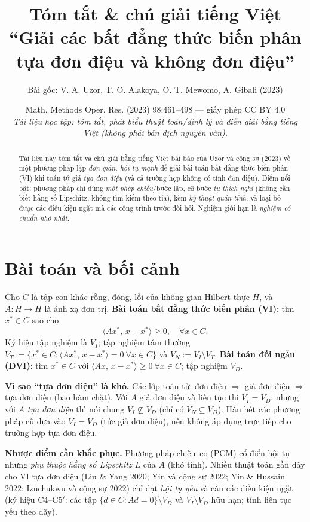 \documentclass[11pt,a4paper]{article}
\title{\vspace{-1.2cm}\bfseries Tóm tắt \& chú giải tiếng Việt\\[4pt]
\large ``Giải các bất đẳng thức biến phân tựa đơn điệu và không đơn điệu''}
\author{\normalsize Bài gốc: V. A. Uzor, T. O. Alakoya, O. T. Mewomo, A. Gibali (2023)}
\date{\small Math. Methods Oper. Res. (2023) 98:461--498 --- giấy phép CC BY 4.0\\[2pt]
\textit{Tài liệu học tập: tóm tắt, phát biểu thuật toán/định lý và diễn giải bằng tiếng Việt (không phải bản dịch nguyên văn).}}
\theoremstyle{plain}
\theoremstyle{definition}
\newcommand{\inp}[2]{\langle #1,\,#2\rangle}
\begin{document}
\maketitle

\begin{abstract}
\noindent Tài liệu này tóm tắt và chú giải bằng tiếng Việt bài báo của Uzor và cộng sự (2023) về một phương pháp lặp \emph{đơn giản, hội tụ mạnh} để giải bài toán bất đẳng thức biến phân (VI) khi toán tử giá \emph{tựa đơn điệu} (và cả trường hợp không có tính đơn điệu). Điểm nổi bật: phương pháp chỉ dùng \emph{một phép chiếu}/bước lặp, cỡ bước \emph{tự thích nghi} (không cần biết hằng số Lipschitz, không tìm kiếm theo tia), kèm \emph{kỹ thuật quán tính}, và loại bỏ được các điều kiện ngặt mà các công trình trước đòi hỏi. Nghiệm giới hạn là \emph{nghiệm có chuẩn nhỏ nhất}.
\end{abstract}

\section{Bài toán và bối cảnh}

Cho $C$ là tập con khác rỗng, đóng, lồi của không gian Hilbert thực $H$, và $A:H\to H$ là ánh xạ đơn trị. \textbf{Bài toán bất đẳng thức biến phân (VI)}: tìm $x^{*}\in C$ sao cho
\[
\inp{Ax^{*}}{x-x^{*}}\ge 0,\quad\forall x\in C. \tag{1.1}
\]
Ký hiệu tập nghiệm là $V_I$; tập nghiệm tầm thường $V_T:=\{x^{*}\in C:\inp{Ax^{*}}{x-x^{*}}=0\ \forall x\in C\}$ và $V_N:=V_I\setminus V_T$. \textbf{Bài toán đối ngẫu (DVI)}: tìm $x^{*}\in C$ với $\inp{Ax}{x-x^{*}}\ge 0\ \forall x\in C$; tập nghiệm $V_D$.

\medskip
\noindent\textbf{Vì sao ``tựa đơn điệu'' là khó.} Các lớp toán tử: đơn điệu $\Rightarrow$ giả đơn điệu $\Rightarrow$ tựa đơn điệu (bao hàm chặt). Với $A$ giả đơn điệu và liên tục thì $V_I=V_D$; nhưng với $A$ \emph{tựa đơn điệu} thì nói chung $V_I\not\subseteq V_D$ (chỉ có $V_N\subseteq V_D$). Hầu hết các phương pháp cũ dựa vào $V_I=V_D$ (tức giả đơn điệu), nên không áp dụng trực tiếp cho trường hợp tựa đơn điệu.

\medskip
\noindent\textbf{Nhược điểm cần khắc phục.} Phương pháp chiếu--co (PCM) cổ điển hội tụ nhưng \emph{phụ thuộc hằng số Lipschitz $L$} của $A$ (khó tính). Nhiều thuật toán gần đây cho VI tựa đơn điệu (Liu \& Yang 2020; Yin và cộng sự 2022; Yin \& Hussain 2022; Izuchukwu và cộng sự 2022) chỉ đạt \emph{hội tụ yếu} và cần các điều kiện ngặt (ký hiệu C4--C5$'$: các tập $\{d\in C:Ad=0\}\setminus V_D$ và $V_I\setminus V_D$ hữu hạn; tính liên tục yếu theo dãy).
\end{document}
